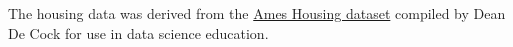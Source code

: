 \documentclass[11pt]{article}
\makeatletter
\newcommand{\boxspacing}{\kern\kvtcb@left@rule\kern\kvtcb@boxsep}
\newcommand{\prompt}[4]{
        \ttfamily\llap{{\color{#2}[#3]:\hspace{3pt}#4}}\vspace{-\baselineskip}
    }
\makeatother
\begin{document}
The housing data was derived from the
\href{http://jse.amstat.org/v19n3/decock.pdf}{Ames Housing dataset}
compiled by Dean De Cock for use in data science education.

    \begin{tcolorbox}[breakable, size=fbox, boxrule=1pt, pad at break*=1mm,colback=cellbackground, colframe=cellborder]
\prompt{In}{incolor}{ }{\boxspacing}
\begin{Verbatim}[commandchars=\\\{\}]

\end{Verbatim}
\end{tcolorbox}


    
    
    
\end{document}
